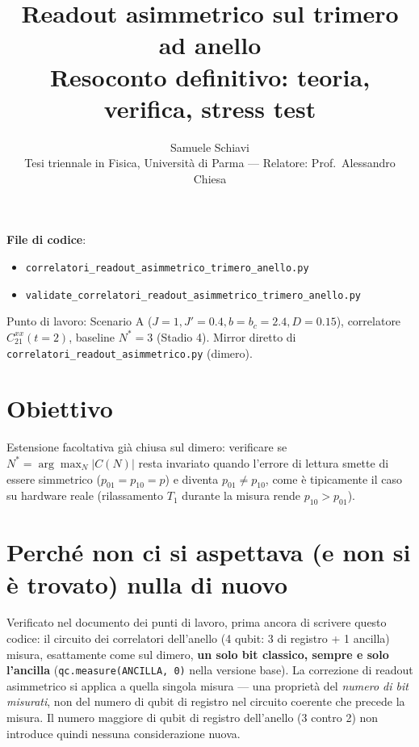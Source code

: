 \documentclass[11pt,a4paper]{article}
\title{\bfseries Readout asimmetrico sul trimero ad anello\\[2pt]
\large Resoconto definitivo: teoria, verifica, stress test}
\author{Samuele Schiavi \\ \small Tesi triennale in Fisica, Università di Parma
--- Relatore: Prof.\ Alessandro Chiesa}
\date{}
\begin{document}
\maketitle
\thispagestyle{fancy}

\noindent\textbf{File di codice}:
\begin{itemize}[nosep,leftmargin=1.3em]
  \item \texttt{correlatori\_readout\_asimmetrico\_trimero\_anello.py}
  \item \texttt{validate\_correlatori\_readout\_asimmetrico\_trimero\_anello.py}
\end{itemize}
\noindent Punto di
lavoro: Scenario A ($J{=}1,J'{=}0.4,b{=}b_c{=}2.4,D{=}0.15$), correlatore $C_{21}^{xx}(t{=}2)$,
baseline $N^*=3$ (Stadio 4). Mirror diretto di
\texttt{correlatori\_readout\_asimmetrico.py} (dimero).

\tableofcontents

\section{Obiettivo}

Estensione facoltativa già chiusa sul dimero: verificare se $N^*=\arg\max_N|C(N)|$ resta
invariato quando l'errore di lettura smette di essere simmetrico ($p_{01}=p_{10}=p$) e diventa
$p_{01}\neq p_{10}$, come è tipicamente il caso su hardware reale (rilassamento $T_1$ durante la
misura rende $p_{10}>p_{01}$).


\section{Perché non ci si aspettava (e non si è trovato) nulla di nuovo}

Verificato nel documento dei punti di lavoro, prima ancora di scrivere questo codice: il circuito
dei correlatori dell'anello (4 qubit: 3 di registro + 1 ancilla) misura, esattamente come sul
dimero, \textbf{un solo bit classico, sempre e solo l'ancilla}
(\texttt{qc.measure(ANCILLA, 0)} nella versione base). La correzione di readout asimmetrico si
applica a quella singola misura --- una proprietà del \emph{numero di bit misurati}, non del
numero di qubit di registro nel circuito coerente che precede la misura. Il numero maggiore di
qubit di registro dell'anello (3 contro 2) non introduce quindi nessuna considerazione nuova.
\end{document}
